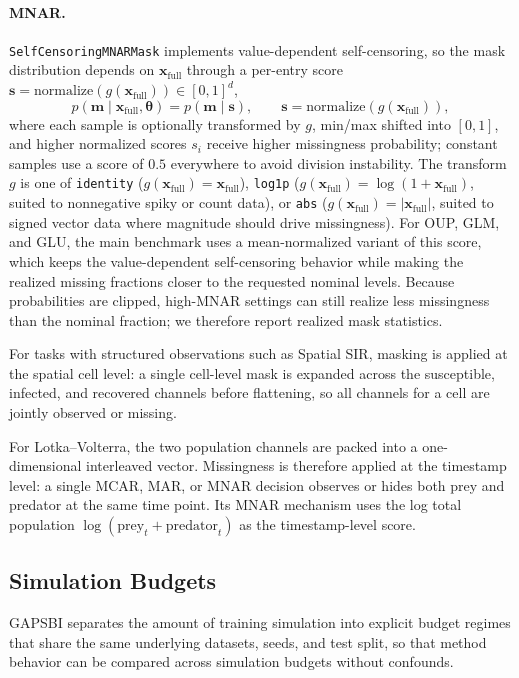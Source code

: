 \documentclass{article} %
\providecommand{\xfull}{\mathbf{x}_{\mathrm{full}}}
\providecommand{\mvec}{\mathbf{m}}
\providecommand{\thetab}{\boldsymbol{\theta}}
\begin{document}
\paragraph{MNAR.} \texttt{SelfCensoringMNARMask} implements value-dependent
self-censoring, so the mask distribution depends on $\xfull$ through a per-entry
score $\mathbf{s} = \mathrm{normalize}(g(\xfull)) \in [0,1]^{d}$,
\begin{equation}
  p(\mvec \mid \xfull, \thetab) = p(\mvec \mid \mathbf{s}),
  \qquad \mathbf{s} = \mathrm{normalize}(g(\xfull)),
  \label{eq:mnar}
\end{equation}
where each sample is optionally transformed by $g$, min/max shifted into
$[0,1]$, and higher normalized scores $s_i$ receive higher missingness
probability; constant samples use a score of $0.5$ everywhere to avoid division
instability. The transform $g$ is one of \texttt{identity} ($g(\xfull) = \xfull$),
\texttt{log1p} ($g(\xfull) = \log(1 + \xfull)$, suited to nonnegative spiky or
count data), or \texttt{abs} ($g(\xfull) = |\xfull|$, suited to
signed vector data where magnitude should drive missingness).
For OUP, GLM, and GLU, the main benchmark uses a mean-normalized variant of this
score, which keeps the value-dependent self-censoring behavior while making the
realized missing fractions closer to the requested nominal levels. Because
probabilities are clipped, high-MNAR settings can still realize less missingness
than the nominal fraction; we therefore report realized mask statistics.

For tasks with structured observations such as Spatial SIR, masking is applied at
the spatial cell level: a single cell-level mask is expanded across the
susceptible, infected, and recovered channels before flattening, so all channels
for a cell are jointly observed or missing.

For Lotka--Volterra, the two population channels are packed into a one-dimensional
interleaved vector. Missingness is therefore applied at the timestamp level: a
single MCAR, MAR, or MNAR decision observes or hides both prey and predator at the
same time point. Its MNAR mechanism uses the log total population
$\log(\mathrm{prey}_t+\mathrm{predator}_t)$ as the timestamp-level score.

\subsection{Simulation Budgets}
\label{sec:budgets}

GAPSBI separates the amount of training simulation into explicit budget regimes
that share the same underlying datasets, seeds, and test split, so that method
behavior can be compared across simulation budgets without confounds.
\end{document}

